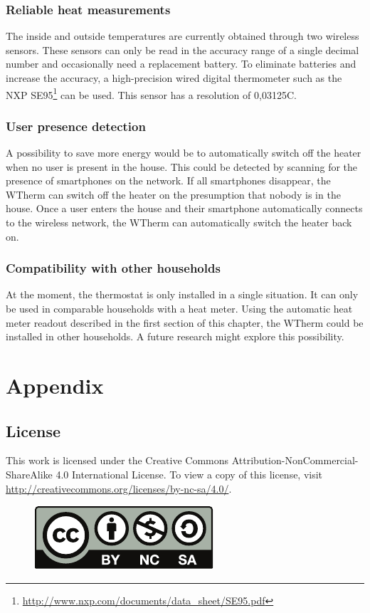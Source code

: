 \documentclass[12pt,a4paper,final]{report}
\begin{document}
\section{Reliable heat measurements}
The inside and outside temperatures are currently obtained through two wireless sensors. These sensors can only be read in the accuracy range of a single decimal number and occasionally need a replacement battery. To eliminate batteries and increase the accuracy, a high-precision wired digital thermometer such as the NXP SE95\footnote{\url{http://www.nxp.com/documents/data_sheet/SE95.pdf}} can be used. This sensor has a resolution of 0,03125\degree{}C.

\section{User presence detection}
A possibility to save more energy would be to automatically switch off the heater when no user is present in the house. This could be detected by scanning for the presence of smartphones on the network. If all smartphones disappear, the WTherm can switch off the heater on the presumption that nobody is in the house. Once a user enters the house and their smartphone automatically connects to the wireless network, the WTherm can automatically switch the heater back on.

\section{Compatibility with other households}
At the moment, the thermostat is only installed in a single situation. It can only be used in comparable households with a heat meter. Using the automatic heat meter readout described in the first section of this chapter, the WTherm could be installed in other households. A future research might explore this possibility.
\newpage
\printbibliography
\vfill

\part*{Appendix}
{}
\chapter{License} \label{chap:License}
This work is licensed under the Creative Commons Attribution-NonCommercial-ShareAlike 4.0 International License. To view a copy of this license, visit \url{http://creativecommons.org/licenses/by-nc-sa/4.0/}.
\begin{figure}[H]
  \begin{center}
      \includegraphics{by-nc-sa}
  \end{center}
\end{figure}
\end{document}
